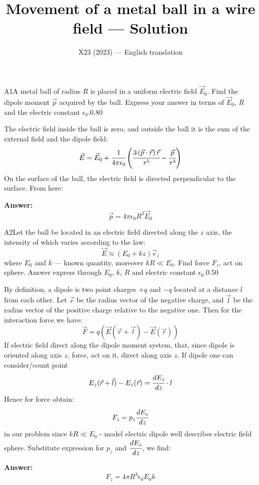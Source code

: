\documentclass[11pt,a4paper]{article}
\title{\textbf{Movement of a metal ball in a wire field --- Solution}}
\author{\normalsize X23 (2023) — English translation}
\date{}
\begin{document}
\maketitle\vspace{-0.5em}
\begin{solcard}{A1}{A metal ball of radius $R$ is placed in a uniform electric field $\vec{E}_0$. Find the dipole moment $\vec{p}$ acquired by the ball. Express your answer in terms of $\vec{E}_0$, $R$ and the electric constant $\epsilon_0$.}{0.80}

The electric field inside the ball is zero, and outside the ball it is the sum of the external field and the dipole field: $$\vec{E}=\vec{E}_0+\cfrac{1}{4\pi\epsilon_0}\left(\cfrac{3\left(\vec{p}\cdot{\vec{r}}\right)\vec{r}}{r^5}-\cfrac{\vec{p}}{r^3}\right) $$ On the surface of the ball, the electric field is directed perpendicular to the surface. From here:

\par\smallskip\noindent\textbf{Answer:} $$\vec{p}=4\pi\epsilon_0R^3\vec{E}_0 $$
\end{solcard}

\begin{solcard}{A2}{Let the ball be located in an electric field directed along the $z$ axis, the intensity of which varies according to the law: $$\vec{E}\approx{\left(E_0+kz\right)\vec{e}_z} $$ where $E_0$ and $k$ — known quantity, moreover $kR\ll{E_0}$. Find force $F_z$, act on sphere. Answer express through $E_0$, $k$, $R$ and electric constant $\epsilon_0$.}{0.50}

By definition, a dipole is two point charges $+q$ and $-q$ located at a distance $l$ from each other. Let $\vec{r}$ be the radius vector of the negative charge, and $\vec{l}$ be the radius vector of the positive charge relative to the negative one. Then for the interaction force we have: $$\vec{F}=q\left(\vec{E}(\vec{r}+\vec{l})-\vec{E}(\vec{r})\right) $$ If electric field direct along the dipole moment system, that, since dipole is oriented along axis $z$, force, act on it, direct along axis $z$. If dipole one can consider/count point $$E_z(\vec{r}+\vec{l})-E_z(\vec{r})=\cfrac{dE_z}{dz}\cdot{l} $$ Hence for force obtain: $$F_z=p_z\cfrac{dE_z}{dz} $$ in our problem since $kR\ll{E_0}$ - model electric dipole well describes electric field sphere. Substitute expression for $p_z$ and $\cfrac{dE_z}{dz}$, we find:

\par\smallskip\noindent\textbf{Answer:} $$F_z=4\pi{R}^3\epsilon_0E_0k $$
\end{solcard}
\end{document}
